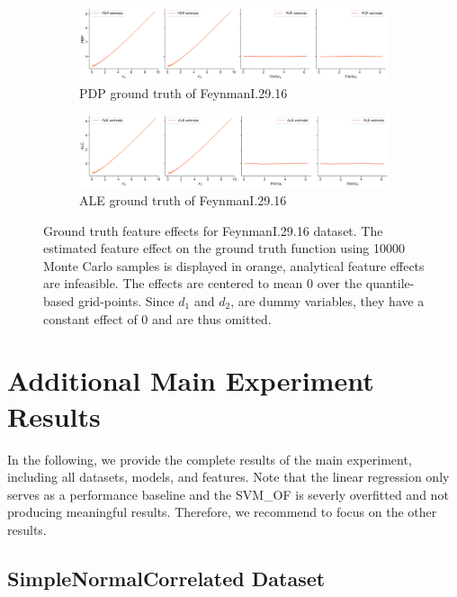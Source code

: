 \documentclass[runningheads]{llncs}
\begin{document}
\begin{figure}[h!]
    \begin{subfigure}[b]{\textwidth}
        \centering
        \includegraphics[width=\textwidth]{img/FeynmanI.29.16-all/pdp_groundtruth_comparison.png}
        \caption{PDP ground truth of FeynmanI.29.16}
    \end{subfigure}
    \begin{subfigure}[b]{\textwidth}
        \centering
        \includegraphics[width=\textwidth]{img/FeynmanI.29.16-all/ale_groundtruth_comparison.png}
        \caption{ALE ground truth of FeynmanI.29.16}
    \end{subfigure}
    \caption{Ground truth feature effects for FeynmanI.29.16 dataset. The estimated feature
    effect on the ground truth function using 10000 Monte Carlo samples is displayed in orange,
    analytical feature effects are infeasible. The effects are centered to mean 0 over the quantile-based grid-points.
    Since $d_1$ and $d_2$, are dummy variables, they have a constant effect of 0 and are
    thus omitted.}
    \label{fig:feynman-groundtruth}  %
\end{figure}

\clearpage
\section{Additional Main Experiment Results}\label{app:additional-results}

In the following, we provide the complete results of the main experiment,
including all datasets, models, and features. Note that the linear regression
only serves as a performance baseline and the SVM\_OF is severly overfitted and
not producing meaningful results. Therefore, we recommend to focus on the
other results.

\subsection{SimpleNormalCorrelated Dataset}
\end{document}
